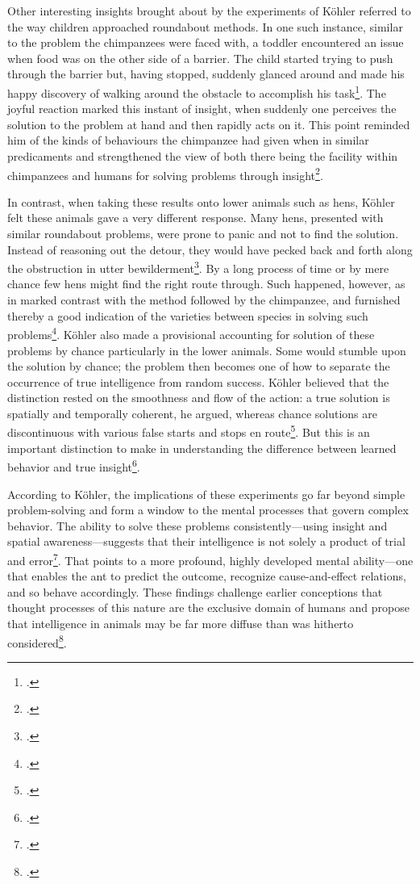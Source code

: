 \documentclass[12pt]{article}
\begin{document}
Other interesting insights brought about by the experiments of Köhler referred to the way children approached roundabout methods. In one such instance, similar to the problem the chimpanzees were faced with, a toddler encountered an issue when food was on the other side of a barrier. The child started trying to push through the barrier but, having stopped, suddenly glanced around and made his happy discovery of walking around the obstacle to accomplish his task\footcite{thorndike1898animal}. The joyful reaction marked this instant of insight, when suddenly one perceives the solution to the problem at hand and then rapidly acts on it. This point reminded him of the kinds of behaviours the chimpanzee had given when in similar predicaments and strengthened the view of both there being the facility within chimpanzees and humans for solving problems through insight\footcite{koehler1921mentality}.

In contrast, when taking these results onto lower animals such as hens, Köhler felt these animals gave a very different response. Many hens, presented with similar roundabout problems, were prone to panic and not to find the solution. Instead of reasoning out the detour, they would have pecked back and forth along the obstruction in utter bewilderment\footcite{koehler1927detours}. By a long process of time or by mere chance few hens might find the right route through. Such happened, however, as in marked contrast with the method followed by the chimpanzee, and furnished thereby a good indication of the varieties between species in solving such problems\footcite{thorndike1898animal}. Köhler also made a provisional accounting for solution of these problems by chance particularly in the lower animals. Some would stumble upon the solution by chance; the problem then becomes one of how to separate the occurrence of true intelligence from random success. Köhler believed that the distinction rested on the smoothness and flow of the action: a true solution is spatially and temporally coherent, he argued, whereas chance solutions are discontinuous with various false starts and stops en route\footcite{koehler1927detours}. But this is an important distinction to make in understanding the difference between learned behavior and true insight\footcite{thorndike1898animal}.

According to Köhler, the implications of these experiments go far beyond simple problem-solving and form a window to the mental processes that govern complex behavior. The ability to solve these problems consistently—using insight and spatial awareness—suggests that their intelligence is not solely a product of trial and error\footcite{koehler1921mentality}. That points to a more profound, highly developed mental ability—one that enables the ant to predict the outcome, recognize cause-and-effect relations, and so behave accordingly. These findings challenge earlier conceptions that thought processes of this nature are the exclusive domain of humans and propose that intelligence in animals may be far more diffuse than was hitherto considered\footcite{koehler1927detours}.
\end{document}
